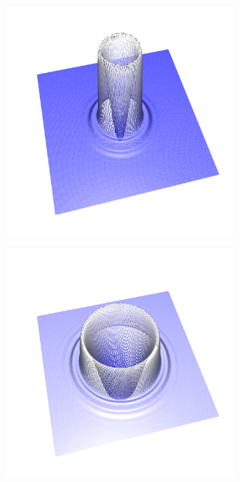 \documentclass[crop=false,10pt,ngerman]{standalone}
\begin{document}
      \begin{figure}[h]
        \center
        \begin{subfigure}[b]{0.24\textwidth}
          \center
          \includegraphics[trim={2cm 1.5cm 1.2cm 1.0cm},clip,width=0.95\textwidth]{images/quad_wave_0.png}
          \caption{}
        \end{subfigure}
        \begin{subfigure}[b]{0.24\textwidth}
          \center
          \includegraphics[trim={2cm 1.5cm 1.2cm 1.0cm},clip,width=0.95\textwidth]{images/quad_wave_1.png}

\end{subfigure}
\end{figure}
\end{document}
